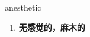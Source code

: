 
\begin{frame}
{\huge anesthetic}
\begin{center}
\begin{enumerate}\Large
  \item \textbf{无感觉的，麻木的}
\end{enumerate}
\end{center}
\end{frame}
